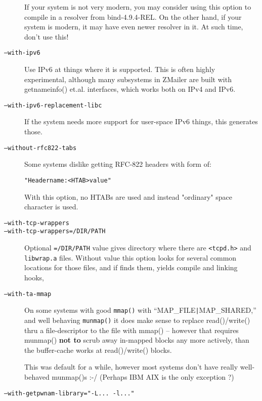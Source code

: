 \begin{description}
If your system is not very modern, you may consider using
this option to compile in a resolver from bind-4.9.4-REL.
On the other hand, if your system is modern, it may have
even newer resolver in it.  At such time, don't use this!

\item[\tt --with-ipv6] \mbox{}

Use IPv6 at things where it is supported.  This is often
highly experimental, although many subsystems in ZMailer
are built with   getnameinfo()  et.al. interfaces, which
works both on IPv4 and IPv6.

\item[\tt --with-ipv6-replacement-libc] \mbox{}

If the system needs more support for user-space IPv6
things, this generates those.

\item[\tt --without-rfc822-tabs] \mbox{}

Some systems dislike getting RFC-822 headers with form of:
\begin{alltt}
   "Headername: <HTAB> value"
\end{alltt}
With this option, no HTABs are used and instead "ordinary"
space character is used.

\item[\tt --with-tcp-wrappers]
\item[\tt --with-tcp-wrappers=/DIR/PATH] \mbox{}

Optional  {\tt =/DIR/PATH}  value gives directory where there are
{\tt <tcpd.h>}  and  {\tt libwrap.a}  files.
Without value this option looks for several common locations
for those files, and if finds them, yields compile and linking
hooks,

\item[\tt --with-ta-mmap] \mbox{}

On some systems with good {\tt mmap()} with ``MAP\_FILE\verb/|/MAP\_SHARED,''
and well behaving  {\tt munmap()}  it does make sense to replace
read()/write() thru a file-descriptor to the file with
mmap() -- however that requires munmap() {\bf not to} scrub
away in-mapped blocks any more actively, than the buffer-cache
works at read()/write() blocks.

This was default for a while, however most systems don't
have really well-behaved munmap()s :-/
(Perhaps IBM AIX is the only exception ?)

\item[\tt --with-getpwnam-library="-L... -l..."] \mbox{} \\


\end{description}
